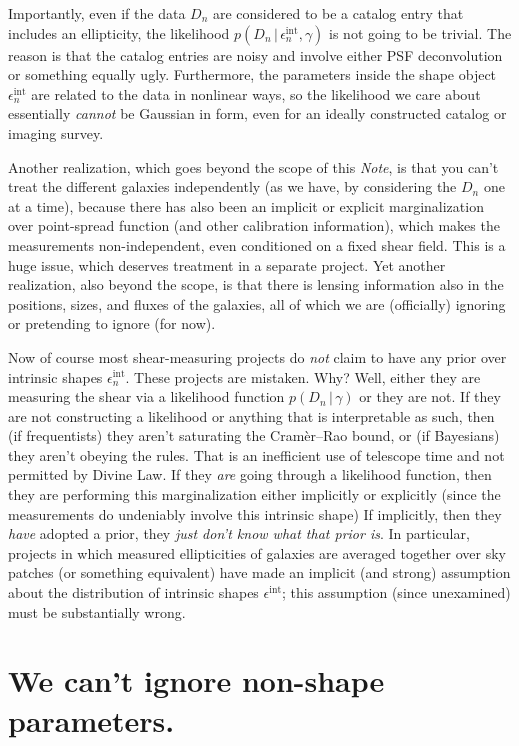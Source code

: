 \documentclass[12pt]{article}
\newcommand{\documentname}{\textsl{Note}}
\newcommand{\given}{\,|\,}
\newcommand{\data}{D}
\newcommand{\shear}{\gamma}
\newcommand{\ellip}{\epsilon}
\newcommand{\intrinsic}{\ellip^{\mathrm{int}}}
\begin{document}
Importantly, even if the data $\data_n$ are considered to be a catalog entry that includes an ellipticity,
  the likelihood $p(\data_n\given\intrinsic_n,\shear)$ is not going to be trivial.
The reason is that the catalog entries are noisy and involve either PSF deconvolution or something equally ugly.
Furthermore, the parameters inside the shape object $\intrinsic_n$ are related to the data in nonlinear ways,
  so the likelihood we care about essentially \emph{cannot} be Gaussian in form,
  even for an ideally constructed catalog or imaging survey.

Another realization, which goes beyond the scope of this \documentname,
  is that you can't treat the different galaxies independently
  (as we have, by considering the $\data_n$ one at a time),
  because there has also been an implicit or explicit marginalization over point-spread function
  (and other calibration information),
  which makes the measurements non-independent, even conditioned on a fixed shear field.
This is a huge issue, which deserves treatment in a separate project.
Yet another realization, also beyond the scope,
  is that there is lensing information also in the positions, sizes, and fluxes
  of the galaxies,
  all of which we are (officially) ignoring or pretending to ignore (for now).

Now of course most shear-measuring projects do \emph{not} claim to have any prior over intrinsic shapes $\intrinsic_n$.
These projects are mistaken.  Why?
Well, either they are measuring the shear via a likelihood function $p(\data_n\given\shear)$ or they are not.
If they are not constructing a likelihood or anything that is interpretable as such,
  then (if frequentists) they aren't saturating the Cram\`er--Rao bound,
  or (if Bayesians) they aren't obeying the rules.
That is an inefficient use of telescope time and not permitted by Divine Law.
If they \emph{are} going through a likelihood function,
  then they are performing this marginalization either implicitly or explicitly
  (since the measurements do undeniably involve this intrinsic shape)
If implicitly, then they \emph{have} adopted a prior, they \emph{just don't know what that prior is}.
In particular, projects in which
  measured ellipticities of galaxies are averaged together over sky patches
  (or something equivalent)
  have made an implicit (and strong) assumption about the distribution of intrinsic shapes $\intrinsic$;
  this assumption (since unexamined) must be substantially wrong.

\section{We can't ignore non-shape parameters.}
\end{document}
